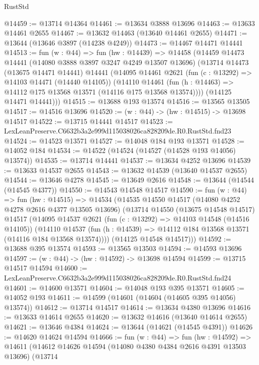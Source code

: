 \begin{lexlean}{RustStd}
\begin{coremodule}
@14459 := @13714 @14364
@14461 := @13634 @3888 @13696
@14463 := @13633 @14461 @2655
@14467 := @13632 @14463 (@13640 @14461 @2655)
@14471 := @13644 (@13646 @3897 (@14238 @4249))
@14473 := @14467 @14471 @14441
@14513 := fun (w : @44) =>
  fun (hw : @14439) =>
  @14458
    (@14459
      @14473
      @14441
      (@14080 @3888 @3897 @3247 @4249 @13507 @13696)
      (@13714
        @14473
        (@13675 @14471 @14441)
        @14441
        (@14095
          @14461
          @2621
          (fun (c : @13292) => @14103 @14471 (@14440 @14105))
          (@14110
            @14461
            (fun (h : @14463) => @14112 @175 @13568 @13571 (@14116 @175 @13568 @13574))))
        (@14125 @14471 @14441)))
@14515 := @13688 @193 @13574
@14516 := @13565 @13505
@14517 := @14516 @13696
@14520 := (w : @44) -> (hw : @14515) -> @13698 @14517
@14522 := @13715 @14441 @14517
@14523 := LexLeanPreserve.C6632b3a2e999d115038026ca828209de.R0.RustStd.fnd23
@14524 := @14523 @13571
@14527 := @14048 @184 @193 @13571
@14528 := @14052 @184
@14534 := @14522 (@14524 (@14527 (@14528 @193 @14056) @13574))
@14535 := @13714 @14441
@14537 := @13634 @4252 @13696
@14539 := @13633 @14537 @2655
@14543 := @13632 @14539 (@13640 @14537 @2655)
@14544 := @13646 @4278
@14545 := @13649 @2616
@14548 := @13644 (@14544 (@14545 @4377))
@14550 := @14543 @14548 @14517
@14590 := fun (w : @44) =>
  fun (hw : @14515) =>
  @14534
    (@14535
      @14550
      @14517
      (@14080 @4252 @4278 @2616 @4377 @13505 @13696)
      (@13714
        @14550
        (@13675 @14548 @14517)
        @14517
        (@14095
          @14537
          @2621
          (fun (c : @13292) => @14103 @14548 (@14516 @14105))
          (@14110
            @14537
            (fun (h : @14539) => @14112 @184 @13568 @13571 (@14116 @184 @13568 @13574))))
        (@14125 @14548 @14517)))
@14592 := @13688 @395 @13574
@14593 := @13565 @13503
@14594 := @14593 @13696
@14597 := (w : @44) -> (hw : @14592) -> @13698 @14594
@14599 := @13715 @14517 @14594
@14600 := LexLeanPreserve.C6632b3a2e999d115038026ca828209de.R0.RustStd.fnd24
@14601 := @14600 @13571
@14604 := @14048 @193 @395 @13571
@14605 := @14052 @193
@14611 := @14599 (@14601 (@14604 (@14605 @395 @14056) @13574))
@14612 := @13714 @14517
@14614 := @13634 @4380 @13696
@14616 := @13633 @14614 @2655
@14620 := @13632 @14616 (@13640 @14614 @2655)
@14621 := @13646 @4384
@14624 := @13644 (@14621 (@14545 @4391))
@14626 := @14620 @14624 @14594
@14666 := fun (w : @44) =>
  fun (hw : @14592) =>
  @14611
    (@14612
      @14626
      @14594
      (@14080 @4380 @4384 @2616 @4391 @13503 @13696)
      (@13714

\end{coremodule}
\end{lexlean}
